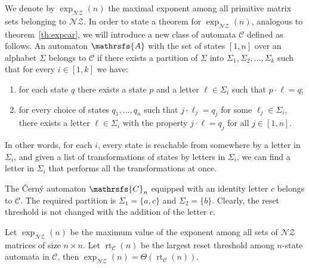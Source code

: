 \documentclass[a4paper,USenglish]{lipics}
\DeclareMathOperator{\rt}{rt}
\theoremstyle{definition}
\begin{document}
We denote by $\exp_{\mathscr{NZ}}(n)$ the maximal exponent among all primitive matrix sets belonging to $\mathscr{NZ}$.
In order to state a theorem for $\exp_{\mathscr{NZ}}(n)$, analogous to theorem~\ref{th:expcar}, we will introduce a new class of automata $\mathscr{C}$ defined as follows. An automaton $\mathrsfs{A}$ with the set of states $[1,n]$ over an alphabet $\Sigma$ belongs to $\mathscr{C}$ if there exists a partition of $\Sigma$ into $\Sigma_1, \Sigma_2, \ldots, \Sigma_k$ such that for every $i \in [1,k]$ we have:
\begin{enumerate}
\item for each state $q$ there exists a state $p$ and a letter $\ell \in \Sigma_i$ such that $p \cdot \ell = q$;
\item for every choice of states $q_1, \ldots , q_n$ such that $j \cdot \ell_j = q_j$ for some $\ell_j \in \Sigma_i$, there exists a letter $\ell \in \Sigma_i$ with the property $j \cdot \ell = q_j$ for all $j \in [1,n]$.
\end{enumerate}
In other words, for each $i$, every state is reachable from somewhere by a letter in $\Sigma_i$, and given a list of transformations of states by letters in $\Sigma_i$, we can find a letter in $\Sigma_i$ that performs all the transformations at once. 
\begin{example}
The \v{C}ern\'{y} automaton $\mathrsfs{C}_n$ equipped with an identity letter $c$ belongs to $\mathscr{C}$. The required partition is $\Sigma_1 = \{a,c\}$ and $\Sigma_2 = \{b\}$. Clearly, the reset threshold is not changed with the addition of the letter $c$.
\end{example}
\begin{theorem}
\label{th:nzrcclass}
Let $\exp_{\mathscr{NZ}}(n)$  be the maximum value of the exponent among all sets of $\mathscr{NZ}$ matrices of size $n \times n$. Let $\rt_{\mathscr{C}}(n)$ be the largest reset threshold among $n$-state automata in $\mathscr{C}$, then $\exp_{\mathscr{NZ}}(n) = \Theta(\rt_{\mathscr{C}}(n))$.
\end{theorem}
\end{document}
